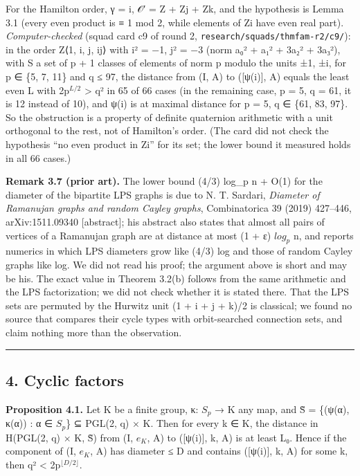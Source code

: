 \documentclass[
  10pt,
]{article}
\begin{document}
For the Hamilton order, γ = i, 𝒪′ = Z + Zj + Zk, and the hypothesis is
Lemma 3.1 (every even product is ≡ 1 mod 2, while elements of Zi have
even real part). \emph{Computer-checked} (squad card c9 of round 2,
\texttt{research/squads/thmfam-r2/c9/}): in the order Z⟨1, i, j, ij⟩
with i² = −1, j² = −3 (norm a₀² + a₁² + 3a₂² + 3a₃²), with S a set of p
+ 1 classes of elements of norm p modulo the units ±1, ±i, for p ∈ \{5,
7, 11\} and q ≤ 97, the distance from (I, A) to ({[}ψ(i){]}, A) equals
the least even L with 2p\(^{L/2}\) \textgreater{} q² in 65 of 66 cases
(in the remaining case, p = 5, q = 61, it is 12 instead of 10), and ψ(i)
is at maximal distance for p = 5, q ∈ \{61, 83, 97\}. So the obstruction
is a property of definite quaternion arithmetic with a unit orthogonal
to the rest, not of Hamilton's order. (The card did not check the
hypothesis ``no even product in Zi'' for its set; the lower bound it
measured holds in all 66 cases.)

\textbf{Remark 3.7 (prior art).} The lower bound (4/3) log\_p n + O(1)
for the diameter of the bipartite LPS graphs is due to N. T. Sardari,
\emph{Diameter of Ramanujan graphs and random Cayley graphs},
Combinatorica 39 (2019) 427--446, arXiv:1511.09340 {[}abstract{]}; his
abstract also states that almost all pairs of vertices of a Ramanujan
graph are at distance at most (1 + ε) \(log_{p}\) n, and reports
numerics in which LPS diameters grow like (4/3) log and those of random
Cayley graphs like log. We did not read his proof; the argument above is
short and may be his. The exact value in Theorem 3.2(b) follows from the
same arithmetic and the LPS factorization; we did not check whether it
is stated there. That the LPS sets are permuted by the Hurwitz unit (1 +
i + j + k)/2 is classical; we found no source that compares their cycle
types with orbit-searched connection sets, and claim nothing more than
the observation.

\begin{center}\rule{0.5\linewidth}{0.5pt}\end{center}

\hypertarget{cyclic-factors}{%
\subsection{4. Cyclic factors}\label{cyclic-factors}}

\textbf{Proposition 4.1.} Let K be a finite group, κ: \(S_{p}\) → K any
map, and S̃ = \{(ψ(α), κ(α)) : α ∈ \(S_{p}\)\} ⊆ PGL(2, q) × K. Then for
every k ∈ K, the distance in H(PGL(2, q) × K, S̃) from (I, \(e_{K}\), A)
to ({[}ψ(i){]}, k, A) is at least L₀. Hence if the component of (I,
\(e_{K}\), A) has diameter ≤ D and contains ({[}ψ(i){]}, k, A) for some
k, then q² \textless{} 2p\(^{⌊D/2⌋}\).
\end{document}
